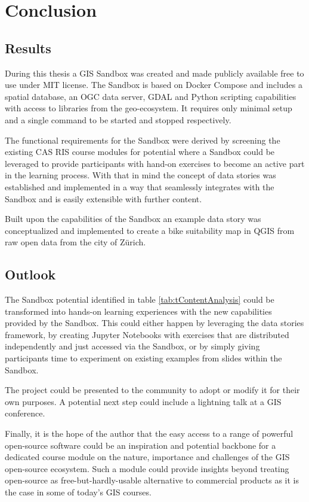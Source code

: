 \documentclass[11pt, a4paper, oneside, parskip=full-]{scrartcl}
\begin{document}
\section{Conclusion}

\subsection{Results}
During this thesis a GIS Sandbox was created and made publicly available free to
use under MIT license\cite{osgissandbox}. The Sandbox is based on Docker Compose
and includes a spatial database, an OGC data server, GDAL and Python scripting
capabilities with access to libraries from the geo-ecosystem. It requires only
minimal setup and a single command to be started and stopped respectively.

The functional requirements for the Sandbox were derived by screening the
existing CAS RIS course modules for potential where a Sandbox could be leveraged
to provide participants with hand-on exercises to become an active part in the
learning process. With that in mind the concept of data stories was established
and implemented in a way that seamlessly integrates with the Sandbox and is
easily extensible with further content.

Built upon the capabilities of the Sandbox an example data story was
conceptualized and implemented to create a bike suitability map in QGIS from raw
open data from the city of Zürich.

\subsection{Outlook}
The Sandbox potential identified in table \ref{tab:tContentAnalysis} could be
transformed into hands-on learning experiences with the new capabilities
provided by the Sandbox. This could either happen by leveraging the data stories
framework, by creating Jupyter Notebooks with exercises that are distributed
independently and just accessed via the Sandbox, or by simply giving
participants time to experiment on existing examples from slides within the
Sandbox.

The project could be presented to the community to adopt or modify it for their
own purposes. A potential next step could include a lightning talk at a GIS
conference.

Finally, it is the hope of the author that the easy access to a range of
powerful open-source software could be an inspiration and potential backbone for
a dedicated course module on the nature, importance and challenges of the GIS
open-source ecosystem. Such a module could provide insights beyond treating
open-source as free-but-hardly-usable alternative to commercial products as it
is the case in some of today's GIS courses.

\newpage
\printbibliography


\end{document}
